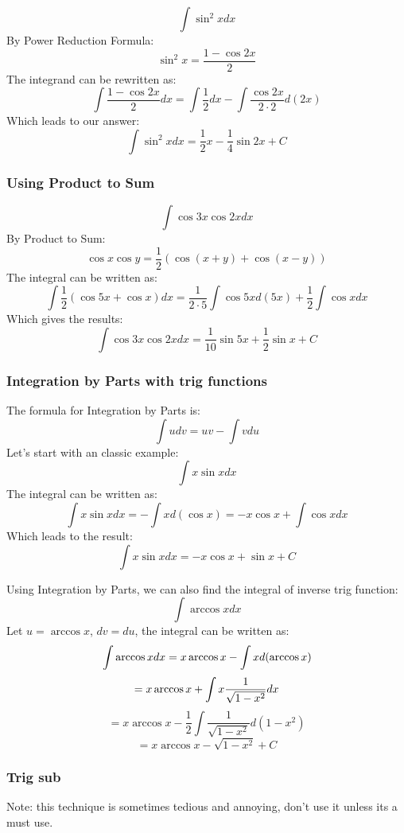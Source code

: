\documentclass{article}
\begin{document}
\[
    \int \sin^2 x dx
\]
By Power Reduction Formula:
\[
    \sin^2 x = \frac{1 - \cos 2x}{2}
\]
The integrand can be rewritten as:
\[
    \int \frac{1 - \cos 2x}{2} dx = \int \frac{1}{2} dx - \int \frac{\cos 2x}{2 \cdot 2} d(2x)
\]
Which leads to our answer:
\begin{equation}
    \int \sin^2 x dx = \frac{1}{2}x - \frac{1}{4} \sin 2x + C
\end{equation}

\subsubsection{Using Product to Sum }
\[
    \int \cos 3x \cos 2x dx
\]
By Product to Sum:
\[
    \cos x \cos y = \frac{1}{2}(\cos(x+y) + \cos(x-y))
\]
The integral can be written as:
\[
    \int \frac{1}{2}(\cos5x + \cos x)dx = \frac{1}{2\cdot 5} \int \cos 5x d(5x) + \frac{1}{2}\int \cos x dx
\]
Which gives the results:
\begin{equation}
    \int \cos 3x \cos 2x dx = \frac{1}{10} \sin 5x + \frac{1}{2} \sin x + C
\end{equation}

\newpage
\subsubsection{Integration by Parts with trig functions}
The formula for Integration by Parts is:
\begin{equation}
    \int u dv = uv - \int v du
\end{equation}
Let's start with an classic example:
\[
    \int x \sin x dx
\]
The integral can be written as:
\[
    \int x \sin x dx = - \int x d(\cos x ) = - x\cos x + \int \cos x dx
\]
Which leads to the result:
\begin{equation}
    \int x \sin x dx = -x \cos x + \sin x + C
\end{equation}

Using Integration by Parts, we can also find the integral of inverse trig function:
\[
    \int \arccos x dx
\]
Let $u = \arccos x$, $dv = du$, the integral can be written as:
\[
    \int \arccos x dx = x\arccos x - \int x d(\arccos x)\\
\]
\[
    = x\arccos x + \int x \frac{1}{\sqrt{1-x^2}}dx\\
\]
\[
    = x\arccos x - \frac{1}{2}\int \frac{1}{\sqrt{1-x^2}} d(1-x^2)
\]
\[
    = x\arccos x - \sqrt{1-x^2} + C
\]

\newpage
\subsubsection{Trig sub}
Note: this technique is sometimes tedious and annoying, don't use it unless its a must use.
\end{document}
